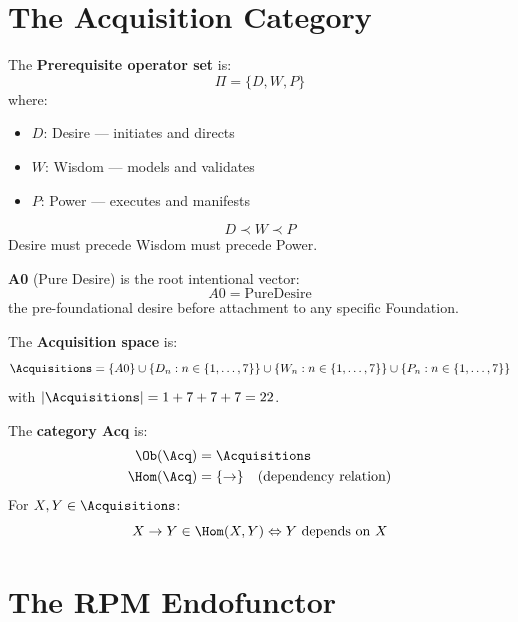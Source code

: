 \section{The Acquisition Category}

\begin{definition}
\label{def:prereq-ops}
The \textbf{Prerequisite operator set} is:
\[
\Pi = \{D, W, P\}
\]
where:
\begin{itemize}
  \item $D$: Desire --- initiates and directs
  \item $W$: Wisdom --- models and validates
  \item $P$: Power --- executes and manifests
\end{itemize}
\end{definition}

\begin{theorem}
\label{thm:prereq-order}
\[
D \prec W \prec P
\]
Desire must precede Wisdom must precede Power.
\end{theorem}

\begin{definition}
\label{def:pure-desire}
\textbf{A0} (Pure Desire) is the root intentional vector:
\[
A0 = \mathrm{PureDesire}
\]
the pre-foundational desire before attachment to any specific Foundation.
\end{definition}

\begin{definition}
\label{def:acq-space}
The \textbf{Acquisition space} is:
\[
\Acquisitions = \{A0\} \cup \{D_n : n \in \{1,\ldots,7\}\} \cup \{W_n : n \in \{1,\ldots,7\}\} \cup \{P_n : n \in \{1,\ldots,7\}\}
\]
with $|\Acquisitions| = 1 + 7 + 7 + 7 = 22$.
\end{definition}

\begin{definition}
\label{def:cat-acq}
The \textbf{category Acq} is:
\begin{align}
\Ob(\Acq) &= \Acquisitions \\
\Hom(\Acq) &= \{\to\} \quad \text{(dependency relation)}
\end{align}
For $X, Y \in \Acquisitions$:
\[
X \to Y \in \Hom(X, Y) \Leftrightarrow Y \text{ depends on } X
\]
\end{definition}

\section{The RPM Endofunctor}

